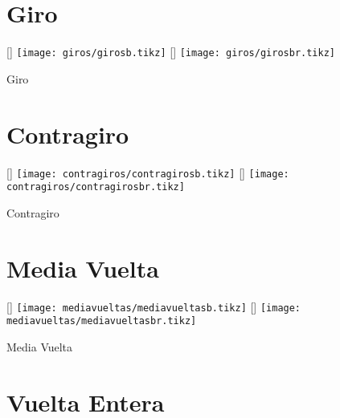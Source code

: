 \section{Giro}
\label{sec:giros}

\begin{minipage}{\linewidth}
	\captionsetup{type=figure}
	[\ahalf\linewidth]
	{\texttt{[image: giros/girosb.tikz]}}
	\hspace*{\fill}
	[\ahalf\linewidth]
	{\texttt{[image: giros/girosbr.tikz]}}
	\caption{Giro}
	\label{fig:giros}
\end{minipage}

\section{Contragiro}
\label{sec:contragiros}

\begin{minipage}{\linewidth}
	\captionsetup{type=figure}
	[\ahalf\linewidth]
	{\texttt{[image: contragiros/contragirosb.tikz]}}
	\hspace*{\fill}
	[\ahalf\linewidth]
	{\texttt{[image: contragiros/contragirosbr.tikz]}}
	\caption{Contragiro}
	\label{fig:contragiro}
\end{minipage}

\section{Media Vuelta}
\label{sec:mediavuelta}

\begin{minipage}{\linewidth}
	\captionsetup{type=figure}
	[\ahalf\linewidth]
	{\texttt{[image: mediavueltas/mediavueltasb.tikz]}}
	\hspace*{\fill}
	[\ahalf\linewidth]
	{\texttt{[image: mediavueltas/mediavueltasbr.tikz]}}
	\caption{Media Vuelta}
	\label{fig:mediavuelta}
\end{minipage}

\FloatBarrier
\section{Vuelta Entera}
\label{sec:vuelta}

